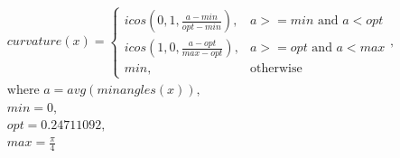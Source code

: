 \begin{equation}
\label{eq:curvature}
\begin{aligned}
    curvature(x) =
    \begin{cases}
        icos(0, 1, \frac{a - min}{opt - min}), & a >= min \text{ and } a < opt \\
        icos(1, 0, \frac{a - opt}{max - opt}), & a >= opt \text{ and } a < max \\
        min, & \text{otherwise}
    \end{cases}, \\
    \text{where } a = avg(minangles(x)), \\
    min = 0, \\
    opt = 0.24711092, \\
    max = \frac{\pi}{4} \\
\end{aligned}
\end{equation}

